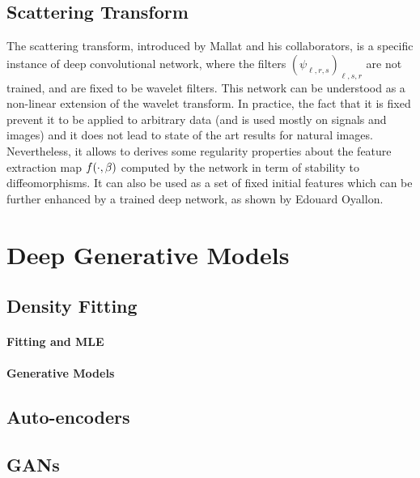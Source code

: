 \subsection{Scattering Transform}
\label{sec-scattering}

The scattering transform, introduced by Mallat and his collaborators, is a specific instance of deep convolutional network, where the filters $ (\psi_{\ell,r,s})_{\ell,s,r}$ are not trained, and are fixed to be wavelet filters. This network can be understood as a non-linear extension of the wavelet transform. In practice, the fact that it is fixed prevent it to be applied to arbitrary data (and is used mostly on signals and images) and it does not lead to state of the art results for natural images. Nevertheless, it allows to derives some regularity properties about the feature extraction map $f(\cdot,\beta)$ computed by the network in term of stability to diffeomorphisms. It can also be used as a set of fixed initial features which can be further enhanced by a trained deep network, as shown by Edouard Oyallon.  


\section{Deep Generative Models}
\label{sec-deepnet-gen}


\subsection{Density Fitting}

\paragraph{Fitting and MLE}

\paragraph{Generative Models}

\subsection{Auto-encoders}

\subsection{GANs}

\fi